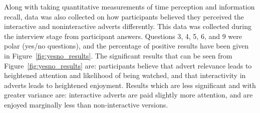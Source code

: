	Along with taking quantitative measurements of time perception and information recall, data was also collected on how participants believed they perceived the interactive and noninteractive adverts differently. This data was collected during the interview stage from participant answers. Questions 3, 4, 5, 6, and 9 were polar (yes/no questions), and the percentage of positive results have been given in Figure~\ref{fig:yesno_results}. The significant results that can be seen from Figure~\ref{fig:yesno_results} are: participants believe that advert relevance leads to heightened attention and likelihood of being watched, and that interactivity in adverts leads to heightened enjoyment. Results which are less significant and with greater variance are: interactive adverts are paid slightly more attention, and are enjoyed marginally less than non-interactive versions.

